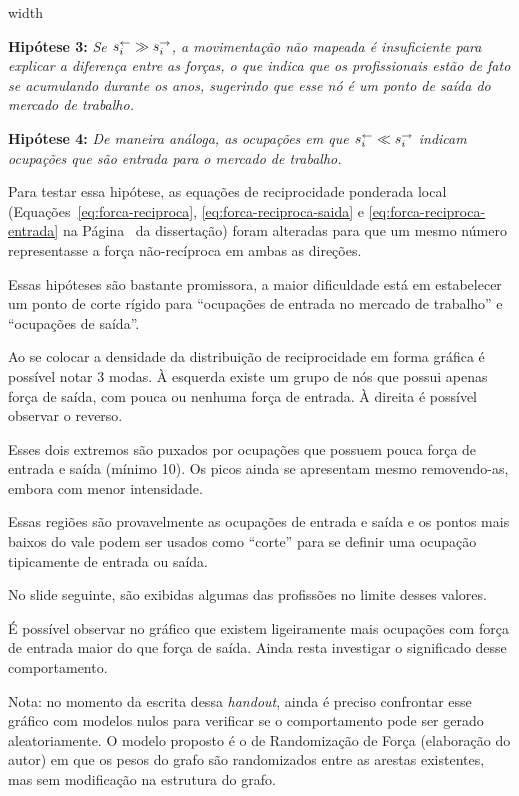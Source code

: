 \documentclass[10pt,a4paper,final]{article}
\newcommand\disappearingrule{%
  \par %
  \vskip10pt %
  \leaders\vrule width \textwidth\vskip0.4pt %
  \nointerlineskip %
  \vskip10pt %
}
\newenvironment{slidelong}[1]
{
  \disappearingrule
  
  \begin{minipage}[t]{\linewidth}
    \setlength{\parskip}{1ex}
    \begin{wrapfigure}{l}{0.5\textwidth}
      \includeslide[width=0.48\textwidth]{#1}%
      \vspace{-0.8cm}
      \label{sde:#1}
    \end{wrapfigure}}
    {\end{minipage}}
\begin{document}
\begin{slidelong}{hipotese-pontos-entrada-e-saida}
  \textbf{Hipótese 3:} \textit{Se $s^\leftarrow_i \gg s^\rightarrow_i$, a movimentação não mapeada é insuficiente para explicar a diferença entre as forças, o que indica que os profissionais estão de fato se acumulando durante os anos, sugerindo que esse nó é um ponto de saída do mercado de trabalho.}
  
  \textbf{Hipótese 4:} \textit{ De maneira análoga, as ocupações em que $s^\leftarrow_i \ll s^\rightarrow_i$ indicam ocupações que são entrada para o mercado de trabalho.}
  
  Para testar essa hipótese, as equações de reciprocidade ponderada local (Equações~\ref{eq:forca-reciproca}, \ref{eq:forca-reciproca-saida} e \ref{eq:forca-reciproca-entrada} na Página~\pageref{eq:forca-reciproca} da dissertação) foram alteradas para que um mesmo número representasse a força não-recíproca em ambas as direções.
  
  Essas hipóteses são bastante promissora, a maior dificuldade está em estabelecer um ponto de corte rígido para \enquote{ocupações de entrada no mercado de trabalho} e \enquote{ocupações de saída}.
  
  Ao se colocar a densidade da distribuição de reciprocidade em forma gráfica é possível notar 3 modas. À esquerda existe um grupo de nós que possui apenas força de saída, com pouca ou nenhuma força de entrada. À direita é possível observar o reverso.
  
  Esses dois extremos são puxados por ocupações que possuem pouca força de entrada e saída (mínimo 10). Os picos ainda se apresentam mesmo removendo-as, embora com menor intensidade.
  
  Essas regiões são provavelmente as ocupações de entrada e saída e os pontos mais baixos do vale podem ser usados como \enquote{corte} para se definir uma ocupação tipicamente de entrada ou saída.
  
  No slide seguinte, são exibidas algumas das profissões no limite desses valores.
  
  É possível observar no gráfico que existem ligeiramente mais ocupações com força de entrada maior do que força de saída. Ainda resta investigar o significado desse comportamento.
  
  Nota: no momento da escrita dessa \textit{handout}, ainda é preciso confrontar esse gráfico com modelos nulos para verificar se o comportamento pode ser gerado aleatoriamente. O modelo proposto é o de Randomização de Força (elaboração do autor) em que os pesos do grafo são randomizados entre as arestas existentes, mas sem modificação na estrutura do grafo.
\end{slidelong}
\end{document}
